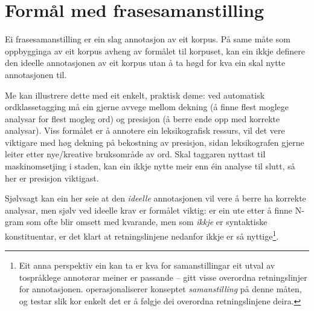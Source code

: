 \documentclass[11pt,a4paper,oneside,draft]{book}
\begin{document}
\section{Formål med frasesamanstilling}
\label{sec-3.2}

\label{SEC:formaal}

Ei frasesamanstilling er ein slag annotasjon av eit korpus. På same
måte som oppbygginga av eit korpus avheng av formålet til korpuset,
kan ein ikkje definere den ideelle annotasjonen av eit korpus utan å
ta høgd for kva ein skal nytte annotasjonen til.

Me kan illustrere dette med eit enkelt, praktisk døme: ved automatisk
ordklassetagging må ein gjerne avvege mellom dekning (å finne flest
moglege analysar for flest mogleg ord) og presisjon (å berre ende opp
med korrekte analysar).  Viss formålet er å annotere ein
leksikografisk ressurs, vil det vere viktigare med høg dekning på
bekostning av presisjon, sidan leksikografen gjerne leiter etter
nye/kreative bruksområde av ord. Skal taggaren nyttast til
maskinomsetjing i staden, kan ein ikkje nytte meir enn éin analyse til
slutt, så her er presisjon viktigast.

Sjølvsagt kan ein her seie at den \emph{ideelle} annotasjonen vil vere å
berre ha korrekte analysar, men sjølv ved ideelle krav er formålet
viktig: er ein ute etter å finne N-gram som ofte blir omsett med
kvarande, men som \emph{ikkje} er syntaktiske konstituentar, er det klart
at retningslinjene nedanfor ikkje er så nyttige\footnote{Eit anna perspektiv ein kan ta er kva for samanstillingar eit
        utval av tospråklege annotørar meiner er passande -- gitt
        visse overordna retningslinjer for
        annotasjonen. \citet{volk2008hjp} operasjonaliserer konseptet
        \emph{samanstilling} på denne måten, og testar slik kor enkelt det
        er å følgje dei overordna retningslinjene deira. }.
\end{document}
